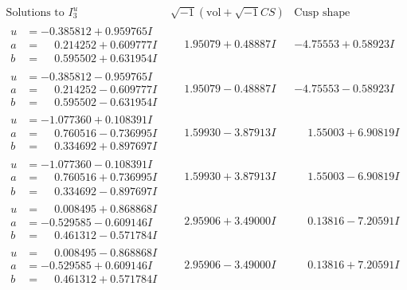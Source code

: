 \documentclass[1p]{elsarticle_modified}
\theoremstyle{definition}
\newcommand{\I}{\sqrt{-1}}
\begin{document}
$$\begin{array}{c|c|c}  
\text{Solutions to }I^u_{3}& \I (\text{vol} + \sqrt{-1}CS) & \text{Cusp shape}\\
 \hline 
\begin{aligned}
u &= -0.385812 + 0.959765 I \\
a &= \phantom{-}0.214252 + 0.609777 I \\
b &= \phantom{-}0.595502 + 0.631954 I\end{aligned}
 & \phantom{-}1.95079 + 0.48887 I & -4.75553 + 0.58923 I \\ \hline\begin{aligned}
u &= -0.385812 - 0.959765 I \\
a &= \phantom{-}0.214252 - 0.609777 I \\
b &= \phantom{-}0.595502 - 0.631954 I\end{aligned}
 & \phantom{-}1.95079 - 0.48887 I & -4.75553 - 0.58923 I \\ \hline\begin{aligned}
u &= -1.077360 + 0.108391 I \\
a &= \phantom{-}0.760516 - 0.736995 I \\
b &= \phantom{-}0.334692 + 0.897697 I\end{aligned}
 & \phantom{-}1.59930 - 3.87913 I & \phantom{-}1.55003 + 6.90819 I \\ \hline\begin{aligned}
u &= -1.077360 - 0.108391 I \\
a &= \phantom{-}0.760516 + 0.736995 I \\
b &= \phantom{-}0.334692 - 0.897697 I\end{aligned}
 & \phantom{-}1.59930 + 3.87913 I & \phantom{-}1.55003 - 6.90819 I \\ \hline\begin{aligned}
u &= \phantom{-}0.008495 + 0.868868 I \\
a &= -0.529585 - 0.609146 I \\
b &= \phantom{-}0.461312 - 0.571784 I\end{aligned}
 & \phantom{-}2.95906 + 3.49000 I & \phantom{-}0.13816 - 7.20591 I \\ \hline\begin{aligned}
u &= \phantom{-}0.008495 - 0.868868 I \\
a &= -0.529585 + 0.609146 I \\
b &= \phantom{-}0.461312 + 0.571784 I\end{aligned}
 & \phantom{-}2.95906 - 3.49000 I & \phantom{-}0.13816 + 7.20591 I \\ \hline\begin{aligned}

\end{aligned}
\end{array}$$
\end{document}
